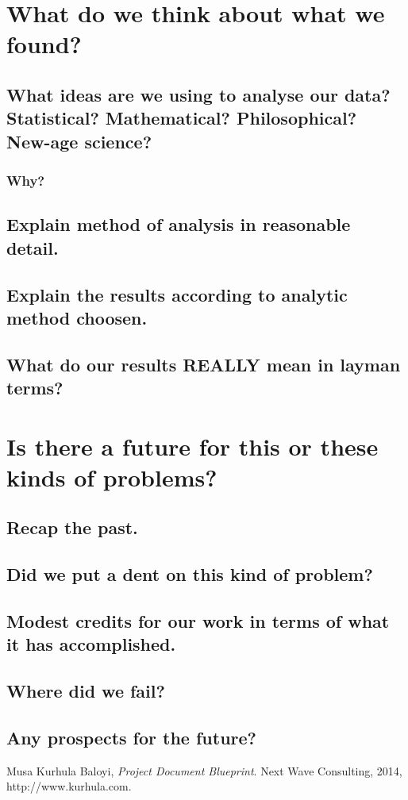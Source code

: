 \documentclass[]{report}
\begin{document}
\chapter{What do we think about what we found?}
\section{What ideas are we using to analyse our data? Statistical? Mathematical? Philosophical? New-age science?} 
\subsection{Why?}
\section{Explain method of analysis in reasonable detail.}
\section{Explain the results according to analytic method choosen.}
\section{What do our results REALLY mean in layman terms?}

\chapter{Is there a future for this or these kinds of problems?}
\section{Recap the past.}
\section{Did we put a dent on this kind of problem?}
\section{Modest credits for our work in terms of what it has accomplished.}
\section{Where did we fail?}
\section{Any prospects for the future?}


\begin{thebibliography}{9}

	Musa Kurhula Baloyi,
	\emph{Project Document Blueprint}.
	Next Wave Consulting,
	2014,
	http://www.kurhula.com.

\end{thebibliography}
\end{document}
